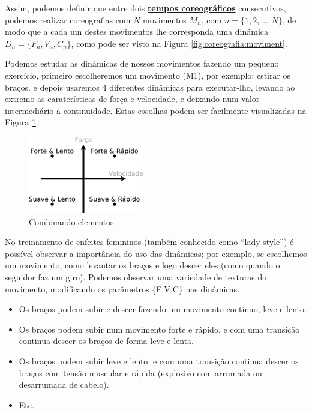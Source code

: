 Assim, podemos definir que entre dois \hyperref[sec:TemposCoreograficos]{\textbf{tempos coreográficos}} consecutivos,
podemos realizar coreografias com $N$ movimentos $M_n$, com $n=\{1, 2, ..., N\}$, 
de modo que a cada um destes movimentos lhe corresponda uma dinâmica $D_n=\{F_n, V_n, C_n\}$,
como pode ser visto na Figura \ref{fig:coreografia:moviment}.
\begin{example}
Podemos estudar as dinâmicas de nossos movimentos fazendo um pequeno exercício,
primeiro escolheremos um movimento (M1), por exemplo: estirar os braços.
e depois usaremos 4 diferentes dinâmicas para executar-lho,
levando ao extremo as caraterísticas de força e velocidade,
e deixando num valor intermediário a continuidade.
Estas escolhas podem ser facilmente visualizadas na Figura \ref{fig:element:moviment2}.
\end{example}


\begin{figure}[!h]
  \centering
    \includegraphics[width=0.45\textwidth]{chapters/cap-musicalidade/dinamicas-elementos2.eps}
\caption{Combinando elementos.}
\label{fig:element:moviment2}
\end{figure}

\begin{example}
No treinamento de enfeites femininos (também conhecido como ``lady style'')
é possível observar a importância do uso das dinâmicas;
por exemplo, se escolhemos um movimento, 
como levantar os braços e logo descer eles (como quando o seguidor faz um giro).
Podemos observar uma variedade de texturas do movimento,
modificando os parâmetros  \{F,V,C\} nas dinâmicas.
\begin{itemize}
\item Os braços podem subir e descer fazendo um movimento continuo, leve e lento.
\item Os braços podem subir num movimento forte e rápido,
e com uma transição continua descer os braços de forma leve e lenta.
\item Os braços podem subir leve e lento,
e com uma transição continua descer os braços com tensão muscular e rápida 
(explosivo com arrumada ou desarrumada de cabelo). 
\item Etc.
\end{itemize}
\end{example}

